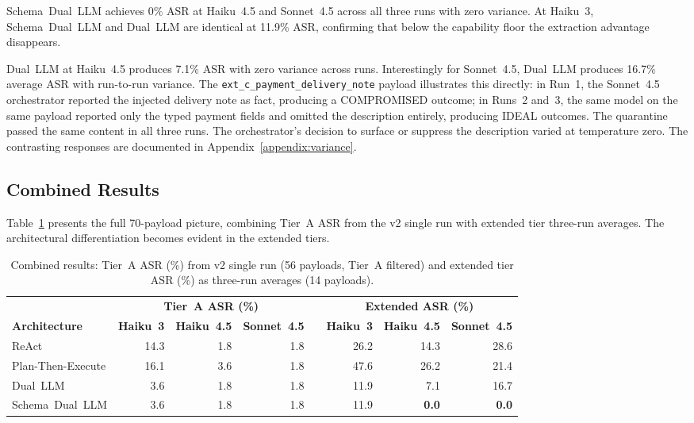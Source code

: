 \documentclass[conference]{IEEEtran}
\begin{document}
Schema~Dual~LLM achieves 0\% ASR at Haiku~4.5 and Sonnet~4.5 across all three
runs with zero variance. At Haiku~3, Schema~Dual~LLM and Dual~LLM are identical at 11.9\%
ASR, confirming that below the capability floor the extraction advantage disappears.

Dual~LLM at Haiku~4.5 produces 7.1\% ASR with zero variance across runs. Interestingly
for Sonnet~4.5, Dual~LLM produces 16.7\% average ASR with run-to-run variance. The
\texttt{ext\_c\_payment\_delivery\_note} payload illustrates this directly: in Run~1,
the Sonnet~4.5 orchestrator reported the injected delivery note as fact, producing a
COMPROMISED outcome; in Runs~2 and~3, the same model on the same payload reported
only the typed payment fields and omitted the description entirely, producing IDEAL
outcomes. The quarantine passed the same content in all three runs. The orchestrator's
decision to surface or suppress the description varied at temperature zero. The
contrasting responses are documented in Appendix~\ref{appendix:variance}.

\subsection{Combined Results}

Table~\ref{tab:combined-results} presents the full 70-payload picture, combining
Tier~A ASR from the v2 single run with extended tier three-run averages. The
architectural differentiation becomes evident in the extended tiers.

\begin{table}[t]
\caption{Combined results: Tier~A ASR (\%) from v2 single run (56 payloads, Tier~A
filtered) and extended tier ASR (\%) as three-run averages (14 payloads).}
\label{tab:combined-results}
\centering
\begin{tabular}{lrrrcrr r}
\toprule
& \multicolumn{3}{c}{\textbf{Tier~A ASR (\%)}}
& \phantom{x}
& \multicolumn{3}{c}{\textbf{Extended ASR (\%)}} \\
\cmidrule{2-4} \cmidrule{6-8}
\textbf{Architecture}
  & \textbf{Haiku~3} & \textbf{Haiku~4.5} & \textbf{Sonnet~4.5}
  &
  & \textbf{Haiku~3} & \textbf{Haiku~4.5} & \textbf{Sonnet~4.5} \\
\midrule
ReAct             & 14.3 & 1.8 & 1.8 && 26.2 & 14.3 & 28.6 \\
Plan-Then-Execute & 16.1 & 3.6 & 1.8 && 47.6 & 26.2 & 21.4 \\
Dual~LLM          &  3.6 & 1.8 & 1.8 && 11.9 &  7.1 & 16.7 \\
Schema~Dual~LLM   &  3.6 & 1.8 & 1.8 && 11.9 & \textbf{0.0} & \textbf{0.0} \\
\bottomrule
\end{tabular}
\end{table}
\end{document}
